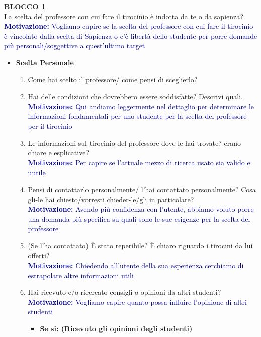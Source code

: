 \textbf{BLOCCO 1}\\
La scelta del professore con cui fare il tirocinio è indotta da te o da sapienza?\\
\textcolor{darkblue}{\textbf{Motivazione:} Vogliamo capire se la scelta del professore con cui fare il tirocinio è vincolato dalla scelta di Sapienza o c'è libertà dello studente
per porre domande più personali/soggettive a quest'ultimo target}
\begin{itemize}
    \item \textbf{Scelta Personale}
    \begin{enumerate}
        \item Come hai scelto il professore/ come pensi di sceglierlo?
        \item Hai delle condizioni che dovrebbero essere soddisfatte? Descrivi quali.\\
        \textcolor{darkblue}{\textbf{Motivazione:} Qui andiamo leggermente nel dettaglio per determinare le informazioni fondamentali per
        uno studente per la scelta del professore per il tirocinio}
        \item Le informazioni sul tirocinio del professore dove le hai trovate? erano chiare e esplicative?\\
        \textcolor{darkblue}{\textbf{Motivazione:} Per capire se l'attuale mezzo di ricerca usato sia valido e uutile}
        \item Pensi di contattarlo personalmente/ l'hai contattato personalmente? Cosa gli-le hai chiesto/vorresti chieder-le/gli in particolare?\\
        \textcolor{darkblue}{\textbf{Motivazione:} Avendo più confidenza con l'utente, abbiamo voluto porre una domanda più specifica su quali sono le sue esigenze per la scelta del professore}
        \item (Se l'ha contattato) È stato reperibile? È chiaro riguardo i tirocini da lui offerti?\\
        \textcolor{darkblue}{\textbf{Motivazione:} Chiedendo all'utente della sua esperienza cerchiamo di estrapolare altre informazioni utili}
        \item Hai ricevuto e/o ricercato consigli o opinioni da altri studenti?\\
        \textcolor{darkblue}{\textbf{Motivazione:} Vogliamo capire quanto possa influire l'opinione di altri studenti}
        \begin{itemize}
            \item \textbf{Se si: (Ricevuto gli opinioni degli studenti)}\\

\end{itemize}
\end{enumerate}
\end{itemize}
